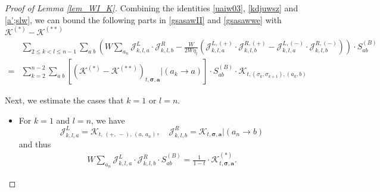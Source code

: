\documentclass[10pt,a4paper]{amsart}
\newcommand{\cal}{\mathcal}
\begin{document}
\begin{proof}[Proof of Lemma \ref{lem_WI_K}]
Combining the identities \eqref{uaiw03}, \eqref{kdjuwsz} and \eqref{a';slw}, we can bound the following parts in \eqref{gsasawII} and \eqref{gsasawwe} with $\cal K^{(*)}-\cal K^{(**)}$ 
\begin{align}\label{WI-pr-Mid}
    & \sum_{  2\le k<l\le n-1} \sum_{a\;b}
    \left( {W}\sum_{a_n} 
        {\cal J}^{L}_{k,l,a}\cdot{\cal J}^{R}_{k,l,b}
        -\frac{W}{2W\eta_t} 
        \left(
        {\cal J}^{L,(+)}_{k,l,a}\cdot{\cal J}^{R,(+)}_{k,l,b}
        -
        {\cal J}^{L,(-)}_{k,l,a}\cdot{\cal J}^{R,(-)}_{k,l,b}
        \right)
        \right)\cdot S^{(B)}_{ab} 
        \\\nonumber
      =  & \sum_{ k=2 }^{n-2} \sum_{a\;b}
        \left[\left({\cal K}^{(*)}-{\cal K}^{(**)}\right)_{t, \boldsymbol{\sigma}, \textbf{a}}\Bigg|(a_k\to a)\right]
        \cdot S^{(B)}_{ab}\cdot  {\cal K}_{t, ( \sigma _k,  \sigma _{k+1}), (a_k,b)}
\end{align}

\bigskip

Next, we estimate the cases that $k=1$ or $l=n$. 

 
\begin{itemize}
\item For $k=1$ and $l=n$, we have 
$$
{\cal J}^L_{k,l,a}  =
 {\cal K}_{t, \,(+,\,-),\, (a,\,a_n)},\quad 
 {\cal J}^R_{k,l,b}={\cal K}_{t, \boldsymbol{\sigma}, \textbf{a}}\Bigg|(a_n\to b)
 $$
 and thus 
 \begin{align}\label{nssfku}
     {W}\sum_{a_n} 
        {\cal J}^{L}_{k,l,a}\cdot{\cal J}^{R}_{k,l,b}\cdot S_{ab}^{(B)}=\frac{1}{1-t}\cdot {\cal K}^{(*)}_{t,\boldsymbol{\sigma},\textbf{a}}.
 \end{align}
 


\end{itemize}
\end{proof}
\end{document}
